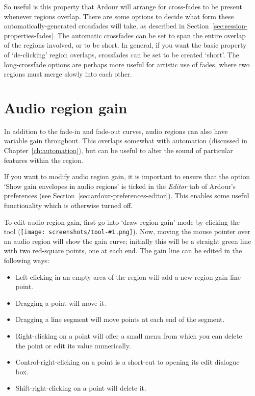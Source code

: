 \documentclass[10pt,a4paper]{book}
\newcommand{\modone}{Control}
\newcommand{\modtertiary}{Shift}
\newcommand{\inlinetool}[1]{\texttt{[image: screenshots/tool-\#1.png]}}
\begin{document}
{So useful is this property that Ardour will arrange for cross-fades to
be present whenever regions overlap.  There are some options to decide
what form these automatically-generated crossfades will take, as
described in Section~\ref{sec:session-properties-fades}.  The
automatic crossfades can be set to span the entire overlap of the
regions involved, or to be short.  In general, if you want the basic
property of `de-clicking' region overlaps, crossfades can be set to be
created `short'.  The long-crossfade options are perhaps more useful for
artistic use of fades, where two regions must merge slowly into each
other.



\section{Audio region gain}
\label{sec:audio-region-gain}

In addition to the fade-in and fade-out curves, audio regions can also
have variable gain throughout.  This overlaps somewhat with automation
(discussed in Chapter~\ref{ch:automation}), but can be useful to alter
the sound of particular features within the region.

If you want to modify audio region gain, it is important to ensure
that the option `Show gain envelopes in audio regions' is ticked in
the \emph{Editor} tab of Ardour's preferences (see
Section~\ref{sec:ardour-preferences-editor}).  This enables some
useful functionality which is otherwise turned off.

To edit audio region gain, first go into `draw region gain' mode by
clicking the tool (\inlinetool{region-gain}).  Now,
moving the mouse pointer over an audio region will show the gain
curve; initially this will be a straight green line with two
red-square points, one at each end.  The gain line can be edited in
the following ways:

\begin{itemize}
\item Left-clicking in an empty area of the region will add a new
  region gain line point.
\item Dragging a point will move it.
\item Dragging a line segment will move points at each end of the segment.
\item Right-clicking on a point will offer a small
  menu from which you can delete the point or edit its value
  numerically.
\item \modone{}-right-clicking on a point is a short-cut to opening
  its edit dialogue box.
\item \modtertiary{}-right-clicking on a point will delete it.
\end{itemize}

}
\end{document}
